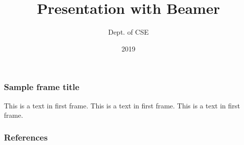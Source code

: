 \documentclass{beamer}
\title{Presentation with Beamer}
\author{Dept. of CSE}
\institute{MIT, Manipal}
\date{2019}
\begin{document}
\frame{\titlepage}
\begin{frame}
\frametitle{Sample frame title}
This is a text in first frame. This is a text in first frame. This is a text
in first frame.
\end{frame}
\begin{frame}
\frametitle{References}
	\tiny{}
	\nocite{*}
	
\end{frame}
\end{document}
